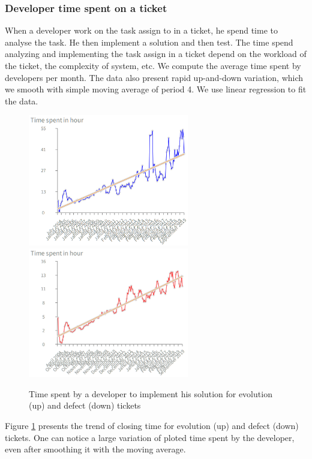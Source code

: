 \documentclass[10pt,conference]{IEEEtran}
\begin{document}
\subsubsection{Developer time spent on a ticket}

When a developer work on the task assign to in a ticket, he spend time to analyse  the task. 
He then implement a solution and then test.
 The time spend analyzing and implementing the task assign in a ticket depend on the workload  of the ticket, the complexity of system, etc.  
We compute the average time spent by developers per month. 
The data also present rapid up-and-down variation, which we smooth with simple moving average of period 4. We use  linear regression to fit the data.   

\begin{figure}[htbp]
  \centering
  \includegraphics[width=70mm]{./images/devEvol.png}\\
  \includegraphics[width=70mm]{./images/devDefect.png}
  \caption{Time spent by a developer to implement his solution for  evolution (up) and defect (down) tickets}
  \label{fig:devTimeDev}
\end{figure}

Figure \ref{fig:devTimeDev} presents the trend of closing time for evolution (up) and defect (down) tickets.
One can notice a large variation of ploted time spent by the developer, even after smoothing it with the moving average.
\end{document}
